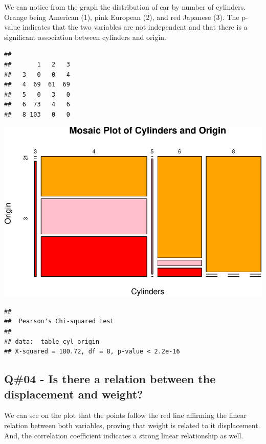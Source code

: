 \documentclass[
]{article}
\begin{document}
We can notice from the graph the distribution of car by number of
cylinders. Orange being American (1), pink European (2), and red
Japanese (3). The p-value indicates that the two variables are not
independent and that there is a significant association between
cylinders and origin.

\begin{verbatim}
##    
##       1   2   3
##   3   0   0   4
##   4  69  61  69
##   5   0   3   0
##   6  73   4   6
##   8 103   0   0
\end{verbatim}

\includegraphics{QuestionCar_files/figure-latex/unnamed-chunk-3-1.pdf}

\begin{verbatim}
## 
##  Pearson's Chi-squared test
## 
## data:  table_cyl_origin
## X-squared = 180.72, df = 8, p-value < 2.2e-16
\end{verbatim}

\newpage

\hypertarget{q04---is-there-a-relation-between-the-displacement-and-weight}{%
\subsection{Q\#04 - Is there a relation between the displacement and
weight?}\label{q04---is-there-a-relation-between-the-displacement-and-weight}}

We can see on the plot that the points follow the red line affirming the
linear relation between both variables, proving that weight is related
to it displacement. And, the correlation coefficient indicates a strong
linear relationship as well.
\end{document}
